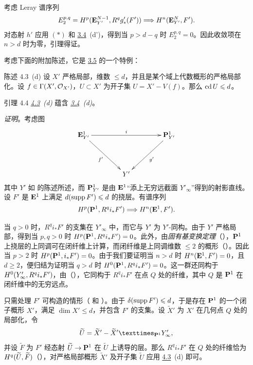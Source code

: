 考虑 Leray 谱序列
$$
E^{p,q}_2=H^{p}(\EE^{N-1}_{Y'},R^{q}g'_{\ast}(F'))
\Longrightarrow H^{n}(\EE^N_{Y'},F'){\quoi}.
$$
对态射 $h'$ 应用 $(\ast)$ 和 \hyperref[XIV.cor3.4]{3.4}~(d')，得到当 $p>d-q$ 时 $E^{p,q}_2=0$。因此收敛项在 $n>d$ 时为零，引理得证。

考虑下面的附加陈述，它是 \hyperref[XIV.cor3.5]{3.5} 的一个特例：

\begin{enonce*}{陈述 4.3~(d)}
设 $X'$ 严格局部，维数 $\leq d$，并且是某个域上代数概形的严格局部化。设 $f\in\Gamma(X',\Oo_{X'})$，$U\subset X'$ 为开子集 $U=X'-V(f)$。那么 $\cd U\leq d$。
\end{enonce*}

\begin{enonce*}{引理 4.4}
\emph{\hyperref[XIV.enon4.3]{4.3}~(d)} 蕴含 \emph{\hyperref[XIV.cor3.4]{3.4}~(d)}。
\end{enonce*}

\noindent
\emph{证明}。\pageoriginale 考虑图
$$
\xymatrix@=1.5cm{
\EE^1_{Y'} \ar[rr]^i \ar[rd]_{f'}&            &
\PP^1_{Y'} \ar[ld]^{g'}\\
                    &       Y'   &
}
$$
其中 $Y'$ 如  的陈述所述，而 $\PP^1_{Y'}$ 是由 $\EE^1$“添上无穷远截面 $Y'_\infty$”得到的射影直线。设 $F'$ 是 $\EE^1$ 上满足 $d(\supp F')\leq d$ 的挠层。有谱序列
$$
H^{p}(\PP^1,R^{q}i_{\ast}F')\Longrightarrow
H^{n}(\EE^1,F'){\quoi}.
$$

当 $q>0$ 时，$R^{q}i_{\ast}F'$ 的支集在 $Y'_\infty$ 中，而它与 $Y'$ 为 $Y'$-同构。由于 $Y'$ 严格局部，得到当 $p,q>0$ 时 $H^{p}(\PP^1,R^{q}i_{\ast}F')=0$。此外，由\emph{固有基变换定理}（），$\PP^1$ 上挠层的上同调可在闭纤维上计算，而闭纤维是上同调维数 $\leq2$ 的概形（）。因此当 $p>2$ 时 $H^{p}(\PP^1,i_{\ast}F')=0$。由于我们要证明当 $n>d$ 时 $H^{n}(\EE^1,F')=0$，且 $d\geq2$，便归结为证明当 $q>d$ 时 $H^{0}(\PP^1,R^{q}i_{\ast}F')=0$。这一群还同构于 $H^{0}(Y'_\infty,R^{\sisi{1}{q}}i_{\ast}F')$，由（），它同构于 $R^{q}i_{\ast}F'$ 在点 $Q$ 处的纤维，其中 $Q$ 是 $\PP^1$ 在闭纤维中的无穷远点。

只需处理 $F'$ 可构造的情形（ 和 ）。由于 $\delta(\supp F')\leq d$，于是存在 $\PP^1$ 的一个闭子概形 $X'$，满足 $\dim X'\leq d$，并包含 $F'$ 的支集。设 $\widetilde X'$ 为 $X'$ 在几何点 $Q$ 处的局部化，令
$$
\widetilde U=\widetilde X'-
\fprod{\widetilde X'}{Y'_\infty}{\PP^1},
$$
并设 $\widetilde F$ 为 $F'$ 经态射 $\widetilde U\rightarrow\PP^1$ 在 $\widetilde U$ 上诱导的层\pageoriginale。那么 $R^{q}i_{\ast}F'$ 在 $Q$ 处的纤维恰为 $H^{\sisi{p}{q}}(\widetilde U,\widetilde F)$（），对严格局部概形 $\widetilde X'$ 及开子集 $\widetilde U$ 应用 \hyperref[XIV.enon4.3]{4.3}~(d) 即可。

